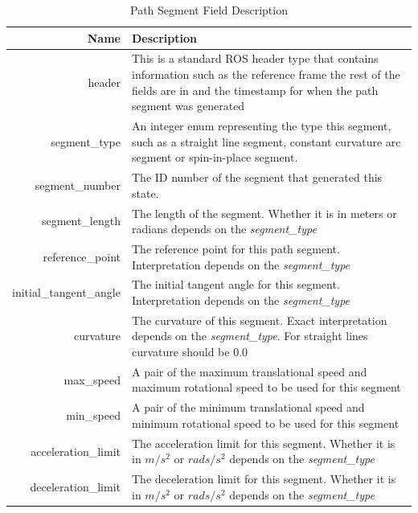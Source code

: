 \begin{table}[htbp]
	\begin{tabularx}{\textwidth}{|r|X|}
		\hline
		Name & Description \\
		\hline
		header & This is a standard ROS header type that contains information such as the reference frame the rest of the fields are in and the timestamp for when the path segment was generated \\
		\hline
		segment\_type & An integer enum representing the type this segment, such as a straight line segment, constant curvature arc segment or spin-in-place segment. \\
		\hline
		segment\_number & The ID number of the segment that generated this state. \\
		\hline
		segment\_length & The length of the segment. Whether it is in meters or radians depends on the \emph{segment\_type} \\
		\hline
		reference\_point & The reference point for this path segment. Interpretation depends on the \emph{segment\_type} \\
		\hline
		initial\_tangent\_angle & The initial tangent angle for this segment. Interpretation depends on the \emph{segment\_type} \\
		\hline
		curvature & The curvature of this segment. Exact interpretation depends on the \emph{segment\_type}. For straight lines curvature should be 0.0 \\
		\hline
		max\_speed & A pair of the maximum translational speed and maximum rotational speed to be used for this segment \\
		\hline
		min\_speed & A pair of the minimum translational speed and minimum rotational speed to be used for this segment \\	
		\hline
		acceleration\_limit & The acceleration limit for this segment. Whether it is in $m/s^2$ or $rads/s^2$ depends on the \emph{segment\_type} \\
		\hline
		deceleration\_limit	& The deceleration limit for this segment. Whether it is in $m/s^2$ or $rads/s^2$ depends on the \emph{segment\_type} \\
		\hline
	\end{tabularx}
	\caption{Path Segment Field Description \label{table:path_segment_description}}
\end{table}


